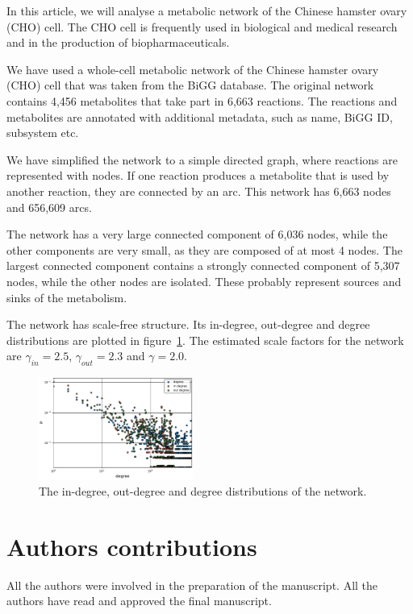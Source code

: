 In this article, we will analyse a metabolic network of the Chinese hamster
ovary (CHO) cell. The CHO cell is frequently used in biological and medical
research and in the production of biopharmaceuticals\cite{chocons}.

We have used a whole-cell metabolic network of the Chinese hamster ovary (CHO)
cell that was taken from the BiGG database\cite{bigg,chocons}. The original
network contains 4,456 metabolites that take part in 6,663 reactions. The
reactions and metabolites are annotated with additional metadata, such as name,
BiGG ID, subsystem etc.

We have simplified the network to a simple directed graph, where reactions are
represented with nodes. If one reaction produces a metabolite that is used by
another reaction, they are connected by an arc. This network has 6,663 nodes and
656,609 arcs.

The network has a very large connected component of 6,036 nodes, while the other
components are very small, as they are composed of at most 4 nodes. The largest
connected component contains a strongly connected component of 5,307 nodes,
while the other nodes are isolated. These probably represent sources and sinks
of the metabolism.

The network has scale-free structure. Its in-degree, out-degree and degree
distributions are plotted in figure~\ref{fig:dist}. The estimated scale factors
for the network are $\gamma_{in} = 2.5$, $\gamma_{out} = 2.3$ and $\gamma =
2.0$. %

\begin{figure}
  \includegraphics[width=0.45\textwidth]{../plots/degree}
  \caption{The in-degree, out-degree and degree distributions of the network.}
  \label{fig:dist}
\end{figure}


\section{Authors contributions}
All the authors were involved in the preparation of the manuscript.
All the authors have read and approved the final manuscript.

